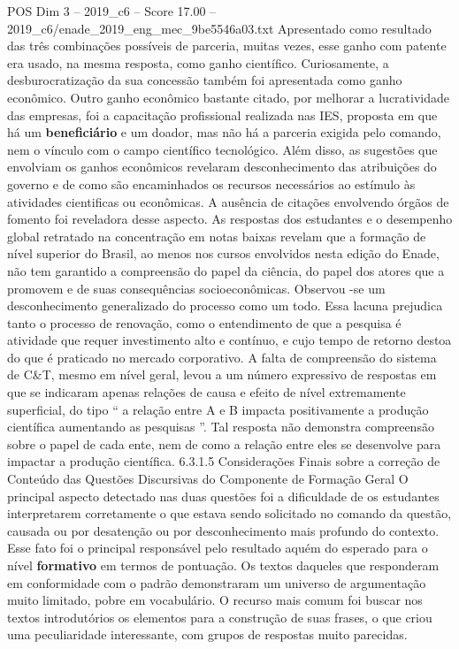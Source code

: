 \begin{textsample}{POS Dim 3 – 2019\_c6 – Score 17.00 – 2019\_c6/enade\_2019\_eng\_mec\_9be5546a03.txt}
Apresentado como resultado das três combinações possíveis de parceria, muitas vezes, esse ganho com patente era usado, na mesma resposta, como ganho científico.
Curiosamente, a desburocratização da sua concessão também foi apresentada como ganho econômico.
Outro ganho econômico bastante citado, por melhorar a lucratividade das empresas, foi a capacitação profissional realizada nas IES, proposta em que há um \textbf{beneficiário} e um doador, mas não há a parceria exigida pelo comando, nem o vínculo com o campo científico tecnológico.
Além disso, as sugestões que envolviam os ganhos econômicos revelaram desconhecimento das atribuições do governo e de como são encaminhados os recursos necessários ao estímulo às atividades cientificas ou econômicas.
A ausência de citações envolvendo órgãos de fomento foi reveladora desse aspecto.
As respostas dos estudantes e o desempenho global retratado na concentração em notas baixas revelam que a formação de nível superior do Brasil, ao menos nos cursos envolvidos nesta edição do Enade, não tem garantido a compreensão do papel da ciência, do papel dos atores que a promovem e de suas consequências socioeconômicas.
Observou -se um desconhecimento generalizado do processo como um todo.
Essa lacuna prejudica tanto o processo de renovação, como o entendimento de que a pesquisa é atividade que requer investimento alto e contínuo, e cujo tempo de retorno destoa do que é praticado no mercado corporativo.
A falta de compreensão do sistema de C\&T, mesmo em nível geral, levou a um número expressivo de respostas em que se indicaram apenas relações de causa e efeito de nível extremamente superficial, do tipo “ a relação entre A e B impacta positivamente a produção científica aumentando as pesquisas ”.
Tal resposta não demonstra compreensão sobre o papel de cada ente, nem de como a relação entre eles se desenvolve para impactar a produção científica. 6.3.1.5 Considerações Finais sobre a correção de Conteúdo das Questões Discursivas do Componente de Formação Geral O principal aspecto detectado nas duas questões foi a dificuldade de os estudantes interpretarem corretamente o que estava sendo solicitado no comando da questão, causada ou por desatenção ou por desconhecimento mais profundo do contexto.
Esse fato foi o principal responsável pelo resultado aquém do esperado para o nível \textbf{formativo} em termos de pontuação.
Os textos daqueles que responderam em conformidade com o padrão demonstraram um universo de argumentação muito limitado, pobre em vocabulário.
O recurso mais comum foi buscar nos textos introdutórios os elementos para a construção de suas frases, o que criou uma peculiaridade interessante, com grupos de respostas muito parecidas.

\end{textsample}
